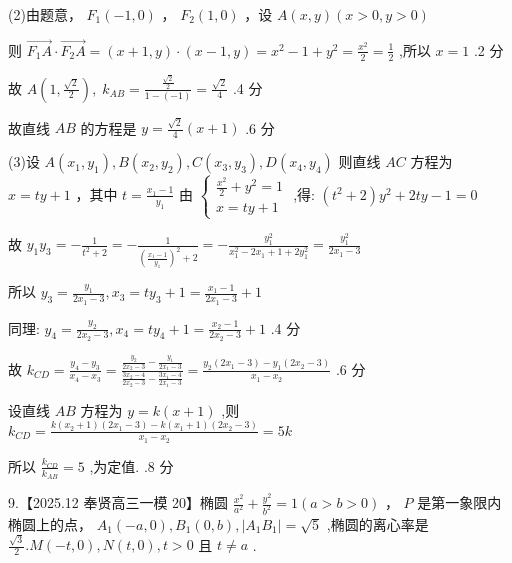 \documentclass[10pt]{article}
\begin{document}
(2)由题意， \({F}_{1}\left( {-1,0}\right)\) ， \({F}_{2}\left( {1,0}\right)\) ，设 \(A\left( {x,y}\right) \left( {x > 0,y > 0}\right)\)

则 \(\overrightarrow{{F}_{1}A} \cdot  \overrightarrow{{F}_{2}A} = \left( {x + 1,y}\right)  \cdot  \left( {x - 1,y}\right)  = {x}^{2} - 1 + {y}^{2} = \frac{{x}^{2}}{2} = \frac{1}{2}\) ,所以 \(x = 1\) .2 分

故 \(A\left( {1,\frac{\sqrt{2}}{2}}\right) ,\;{k}_{AB} = \frac{\frac{\sqrt{2}}{2}}{1 - \left( {-1}\right) } = \frac{\sqrt{2}}{4}\) .4 分

故直线 \({AB}\) 的方程是 \(y = \frac{\sqrt{2}}{4}\left( {x + 1}\right)\) .6 分

(3)设 \(A\left( {{x}_{1},{y}_{1}}\right) ,B\left( {{x}_{2},{y}_{2}}\right) ,C\left( {{x}_{3},{y}_{3}}\right) ,D\left( {{x}_{4},{y}_{4}}\right)\) 则直线 \({AC}\) 方程为 \(x = {ty} + 1\) ，其中 \(t = \frac{{x}_{1} - 1}{{y}_{1}}\) 由 \(\left\{  \begin{array}{l} \frac{{x}^{2}}{2} + {y}^{2} = 1 \\  x = {ty} + 1 \end{array}\right.\) ,得: \(\left( {{t}^{2} + 2}\right) {y}^{2} + {2ty} - 1 = 0\)

故 \({y}_{1}{y}_{3} =  - \frac{1}{{t}^{2} + 2} =  - \frac{1}{{\left( \frac{{x}_{1} - 1}{{y}_{1}}\right) }^{2} + 2} =  - \frac{{y}_{1}^{2}}{{x}_{1}^{2} - 2{x}_{1} + 1 + 2{y}_{1}^{2}} = \frac{{y}_{1}^{2}}{2{x}_{1} - 3}\)

所以 \({y}_{3} = \frac{{y}_{1}}{2{x}_{1} - 3},{x}_{3} = t{y}_{3} + 1 = \frac{{x}_{1} - 1}{2{x}_{1} - 3} + 1\)

同理: \({y}_{4} = \frac{{y}_{2}}{2{x}_{2} - 3},{x}_{4} = t{y}_{4} + 1 = \frac{{x}_{2} - 1}{2{x}_{2} - 3} + 1\) .4 分

故 \({k}_{CD} = \frac{{y}_{4} - {y}_{3}}{{x}_{4} - {x}_{3}} = \frac{\frac{{y}_{2}}{2{x}_{2} - 3} - \frac{{y}_{1}}{2{x}_{1} - 3}}{\frac{3{x}_{2} - 4}{2{x}_{2} - 3} - \frac{3{x}_{1} - 4}{2{x}_{1} - 3}} = \frac{{y}_{2}\left( {2{x}_{1} - 3}\right)  - {y}_{1}\left( {2{x}_{2} - 3}\right) }{{x}_{1} - {x}_{2}}\) .6 分

设直线 \({AB}\) 方程为 \(y = k\left( {x + 1}\right)\) ,则 \({k}_{CD} = \frac{k\left( {{x}_{2} + 1}\right) \left( {2{x}_{1} - 3}\right)  - k\left( {{x}_{1} + 1}\right) \left( {2{x}_{2} - 3}\right) }{{x}_{1} - {x}_{2}} = {5k}\)

所以 \(\frac{{k}_{CD}}{{k}_{AB}} = 5\) ,为定值. .8 分

9.【2025.12 奉贤高三一模 20】椭圆 \(\frac{{x}^{2}}{{a}^{2}} + \frac{{y}^{2}}{{b}^{2}} = 1\left( {a > b > 0}\right)\) ， \(P\) 是第一象限内椭圆上的点， \({A}_{1}\left( {-a,0}\right) ,{B}_{1}\left( {0,b}\right) ,\left| {{A}_{1}{B}_{1}}\right|  = \sqrt{5}\) ,椭圆的离心率是 \(\frac{\sqrt{3}}{2}.M\left( {-t,0}\right) ,N\left( {t,0}\right) ,t > 0\) 且 \(t \neq  a\) .
\end{document}
